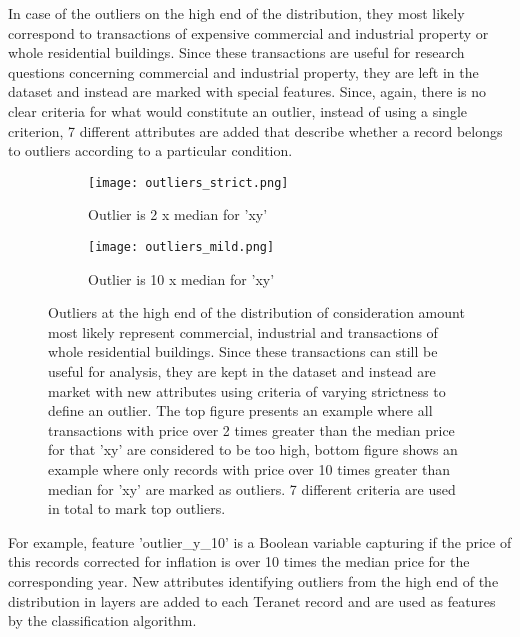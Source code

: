 In case of the outliers on the high end of the distribution, they most likely correspond to transactions of expensive commercial and industrial property or whole residential buildings.
Since these transactions are useful for research questions concerning commercial and industrial property, they are left in the dataset and instead are marked with special features.
Since, again, there is no clear criteria for what would constitute an outlier, instead of using a single criterion, 7 different attributes are added that describe whether a record belongs to outliers according to a particular condition.

\begin{figure}[ht]
    \centering
    \begin{subfigure}{\linewidth}
        \centering
        \texttt{[image: outliers\_strict.png]}
        \label{fig:top_outliers_mild}
        \caption{Outlier is 2 x median for 'xy'}
    \end{subfigure}

    \begin{subfigure}{\linewidth}
        \centering
        \texttt{[image: outliers\_mild.png]}
        \label{fig:top_outliers_strict}
        \caption{Outlier is 10 x median for 'xy'}
    \end{subfigure}
    \caption{Outliers at the high end of the distribution of consideration amount most likely represent commercial, industrial and transactions of whole residential buildings.
    Since these transactions can still be useful for analysis, they are kept in the dataset and instead are market with new attributes using criteria of varying strictness to define an outlier.
    The top figure presents an example where all transactions with price over 2 times greater than the median price for that 'xy' are considered to be too high, bottom figure shows an example where only records with price over 10 times greater than median for 'xy' are marked as outliers.
    7 different criteria are used in total to mark top outliers.}
    \label{fig:top_outliers}
\end{figure}

For example, feature 'outlier\_y\_10' is a Boolean variable capturing if the price of this records corrected for inflation is over 10 times the median price for the corresponding year.
New attributes identifying outliers from the high end of the distribution in layers are added to each Teranet record and are used as features by the classification algorithm.


